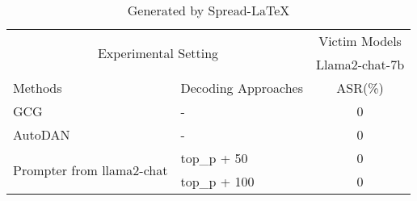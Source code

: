 \begin{table}[H]\centering
\caption{Generated by Spread-LaTeX}\label{tab: }
\scriptsize
\begin{tabular}{llc}\toprule
\multicolumn{2}{c}{\multirow{2}{*}{Experimental Setting}} &\multicolumn{1}{c}{Victim Models} \\
\cmidrule{3-3}
& & Llama2-chat-7b\\
\midrule
Methods & Decoding Approaches  & ASR(\%)\\
\midrule
GCG & - & 0 \\ %
\cmidrule{1-3}
AutoDAN & - & 0 \\ %
\cmidrule{1-3} %
\multirow{2}{*}{Prompter from llama2-chat} &top\_p + 50 &0 \\
&top\_p + 100 &0 \\
\bottomrule
\end{tabular}
\end{table}
